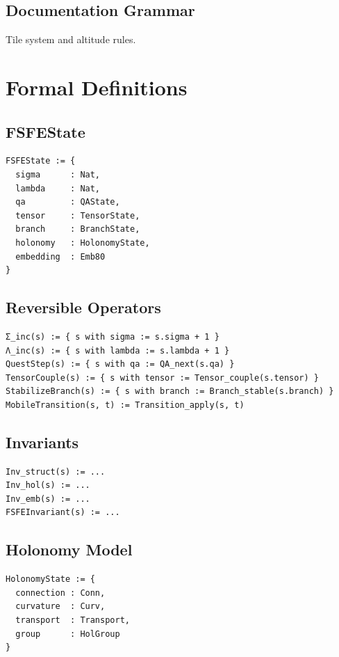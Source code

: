 \documentclass[11pt]{article}
\begin{document}
\subsection{Documentation Grammar}
Tile system and altitude rules.

\newpage



\section{Formal Definitions}

\subsection{FSFEState}
\begin{verbatim}
FSFEState := {
  sigma      : Nat,
  lambda     : Nat,
  qa         : QAState,
  tensor     : TensorState,
  branch     : BranchState,
  holonomy   : HolonomyState,
  embedding  : Emb80
}
\end{verbatim}

\subsection{Reversible Operators}
\begin{verbatim}
Σ_inc(s) := { s with sigma := s.sigma + 1 }
Λ_inc(s) := { s with lambda := s.lambda + 1 }
QuestStep(s) := { s with qa := QA_next(s.qa) }
TensorCouple(s) := { s with tensor := Tensor_couple(s.tensor) }
StabilizeBranch(s) := { s with branch := Branch_stable(s.branch) }
MobileTransition(s, t) := Transition_apply(s, t)
\end{verbatim}

\subsection{Invariants}
\begin{verbatim}
Inv_struct(s) := ...
Inv_hol(s) := ...
Inv_emb(s) := ...
FSFEInvariant(s) := ...
\end{verbatim}

\subsection{Holonomy Model}
\begin{verbatim}
HolonomyState := {
  connection : Conn,
  curvature  : Curv,
  transport  : Transport,
  group      : HolGroup
}
\end{verbatim}
\end{document}
